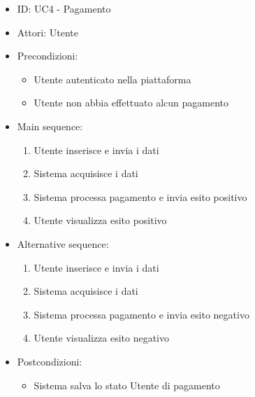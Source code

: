 \documentclass{article}
\begin{document}
\begin{itemize}[label = { }]
    \itemsep0px
    \item ID: UC4 - Pagamento
    \item Attori: Utente
    \item Precondizioni: 
        \begin{itemize}[label = {-}]
            \item Utente autenticato nella piattaforma
            \item Utente non abbia effettuato alcun pagamento
        \end{itemize}
    \item Main sequence: 
        \begin{enumerate}
            \item Utente inserisce e invia i dati
            \item Sistema acquisisce i dati
            \item Sistema processa pagamento e invia esito positivo
            \item Utente visualizza esito positivo
        \end{enumerate}
    \item Alternative sequence:
        \begin{enumerate}
            \item Utente inserisce e invia i dati
            \item Sistema acquisisce i dati
            \item Sistema processa pagamento e invia esito negativo
            \item Utente visualizza esito negativo
        \end{enumerate}
    \item Postcondizioni: 
        \begin{itemize}[label = {-}]
            \item Sistema salva lo stato Utente di pagamento
        \end{itemize}
\end{itemize}
\end{document}
